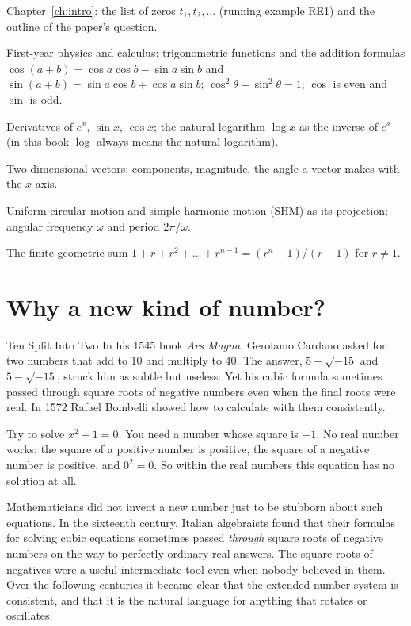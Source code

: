 \begin{prerequisites}
\item Chapter~\ref{ch:intro}: the list of zeros $t_1, t_2,\dots$ (running example RE1) and the outline of the paper's question.
\item First-year physics and calculus: trigonometric functions and the addition formulas $\cos(a+b)=\cos a\cos b-\sin a\sin b$ and $\sin(a+b)=\sin a\cos b+\cos a\sin b$; $\cos^2\theta+\sin^2\theta=1$; $\cos$ is even and $\sin$ is odd.
\item Derivatives of $e^x$, $\sin x$, $\cos x$; the natural logarithm $\log x$ as the inverse of $e^x$ (in this book $\log$ always means the natural logarithm).
\item Two-dimensional vectors: components, magnitude, the angle a vector makes with the $x$ axis.
\item Uniform circular motion and simple harmonic motion (SHM) as its projection; angular frequency $\omega$ and period $2\pi/\omega$.
\item The finite geometric sum $1+r+r^2+\dots+r^{n-1}=(r^n-1)/(r-1)$ for $r\neq1$.
\end{prerequisites}

\section{Why a new kind of number?}\label{sec:complex-why}
\begin{didyouknow}{Ten Split Into Two}
In his 1545 book \emph{Ars Magna}, Gerolamo Cardano asked for two numbers that add to 10 and multiply to 40. The answer, $5+\sqrt{-15}$ and $5-\sqrt{-15}$, struck him as subtle but useless. Yet his cubic formula sometimes passed through square roots of negative numbers even when the final roots were real. In 1572 Rafael Bombelli showed how to calculate with them consistently.
\end{didyouknow}

Try to solve $x^2+1=0$. You need a number whose square is $-1$. No real number works: the square of a positive number is positive, the square of a negative number is positive, and $0^2=0$. So within the real numbers this equation has no solution at all.

Mathematicians did not invent a new number just to be stubborn about such equations. In the sixteenth century, Italian algebraists found that their formulas for solving cubic equations sometimes passed \emph{through} square roots of negative numbers on the way to perfectly ordinary real answers. The square roots of negatives were a useful intermediate tool even when nobody believed in them. Over the following centuries it became clear that the extended number system is consistent, and that it is the natural language for anything that rotates or oscillates.

